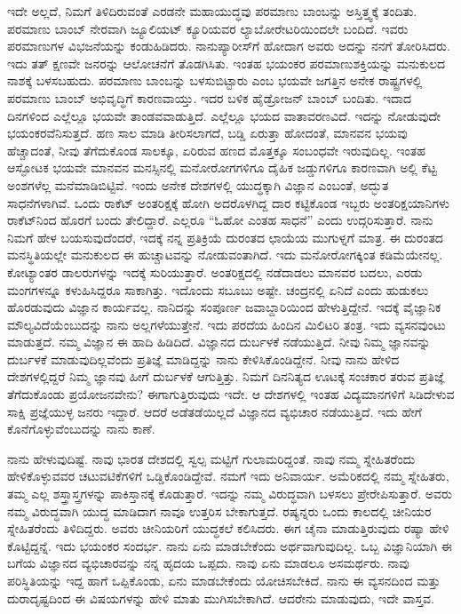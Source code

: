 ಇದೇ ಅಲ್ಲದೆ, ನಿಮಗೆ ತಿಳಿದಿರುವಂತೆ ಎರಡನೇ ಮಹಾಯುದ್ಧವು ಪರಮಾಣು ಬಾಂಬನ್ನು ಅಸ್ತಿತ್ತ್ವಕ್ಕೆ ತಂದಿತು. ಪರಮಾಣು ಬಾಂಬ್ ನೇರವಾಗಿ ಜ್ಯೂಲಿಯಟ್ ಕ್ಯೂರಿಯವರ ಲ್ಯಾಬೋರೇಟರಿ\-ಯಿಂದಲೇ ಬಂದಿದೆ. ಇವರು ಪರಮಾಣುಗಳ ವಿಭಜನೆಯನ್ನು ಕಂಡುಹಿಡಿದರು. ನಾನು\break ಪ್ಯಾರೀಸ್‍ಗೆ ಹೋದಾಗ ಅವರು ಅದನ್ನು ನನಗೆ ತೋರಿಸಿದರು. ಇದು ತತ್ ಕ್ಷಣವೇ ಜನರನ್ನು ಆಲೋಚನೆಗೆ ತೊಡಗಿಸಿತು. ಇಂತಹ ಭಯಂಕರ ಪರಮಾಣುಶಕ್ತಿಯನ್ನು ಮನುಕುಲದ ನಾಶಕ್ಕೆ ಬಳಸಬಹುದು. ಪರಮಾಣು ಬಾಂಬನ್ನು ಬಳಸುಬಿಟ್ಟಾರು ಎಂಬ ಭಯವೇ ಜಗತ್ತಿನ ಅನೇಕ ರಾಷ್ಟ್ರಗಳಲ್ಲಿ ಪರಮಾಣು ಬಾಂಬ್ ಅಭಿವೃದ್ಧಿಗೆ ಕಾರಣವಾಯ್ತು. ಇದರ ಬಳಿಕ ಹೈಡ್ರೋಜನ್ ಬಾಂಬ್ ಬಂದಿತು. ಇದಾದ ದಿನಗಳಿಂದ ಎಲ್ಲೆಲ್ಲೂ ಭಯವೇ ತಾಂಡವವಾಡುತ್ತಿದೆ. ಎಲ್ಲೆಲ್ಲೂ ಭಯದ ವಾತಾವರಣವಿದೆ. ಇದನ್ನು ನೋಡುವುದೇ ಭಯಂಕರವೆನಿಸುತ್ತದೆ. ಹಣ ಸಾಲ ಮಾಡಿ ತೀರಿಸಲಾಗದೆ, ಬಡ್ಡಿ ಏರುತ್ತಾ ಹೋದಂತೆ, ಮಾನವನ ಭಯವು ಹೆಚ್ಚಾದಂತೆ, ನೀವು ತೆಗೆದುಕೊಂಡ ಸಾಲಕ್ಕೂ, ಏರಿರುವ ಹಣದ ಮೊತ್ತಕ್ಕೂ ಸಂಬಂಧವೇ ಇರುವುದಿಲ್ಲ. ಇಂತಹ ಆಸ್ಫೋಟಕ ಭಯವೇ ಮಾನವನ ಮನಸ್ಸಿನಲ್ಲಿ ಮನೋರೋಗಗಳಿಗೂ ದೈಹಿಕ ಜಡ್ಡುಗಳಿಗೂ ಕಾರಣವಾಗಿ ಅಲ್ಲಿ ಕೆಟ್ಟ ಅಂಶಗಳೆಲ್ಲ ಮನೆಮಾಡಿಬಿಟ್ಟಿವೆ. ಇಂದು ಅನೇಕ ದೇಶಗಳಲ್ಲಿ ಯುದ್ಧಕ್ಕಾಗಿ ವಿಜ್ಞಾನ ಎಂಬಂತೆ, ಅದ್ಭುತ ಸಾಧನೆಗಳಾಗಿವೆ. ಒಂದು ರಾಕೆಟ್ ಅಂತರಿಕ್ಷಕ್ಕೆ ಹೋಗಿ ಅದರೊಳಗಿದ್ದ ದಾರ ಕಟ್ಟಿಕೊಂಡ ಇಬ್ಬರು ಅಂತರಿಕ್ಷಯಾನಿಗಳು ರಾಕೆಟ್‍ನಿಂದ ಹೊರಗೆ ಬಂದು ತೇಲಿದ್ದಾರೆ. ಎಲ್ಲರೂ “ಓಹೋ ಎಂತಹ ಸಾಧನೆ” ಎಂದು ಉದ್ಗರಿಸುತ್ತಾರೆ. ನಾನು ನಿಮಗೆ ಹೇಳ ಬಯಸುವುದೆಂದರೆ, ಇದಕ್ಕೆ ನನ್ನ ಪ್ರತಿಕ್ರಿಯೆ ದುರಂತದ ಛಾಯೆಯ ಮುಗುಳ್ನಗೆ ಮಾತ್ರ. ಈ ದುರಂತದ ಮನಸ್ಥಿತಿಯಲ್ಲೇ ಮನುಕುಲದ ಈ ಹುಚ್ಚಾಟವನ್ನು ನೋಡುವಂತಾಗಿದೆ. ಇದು ಮನೋರೋಗಕ್ಕಿಂತ ಕಡಿಮೆಯೇನಲ್ಲ. ಕೋಟ್ಯಾಂತರ ಡಾಲರುಗಳನ್ನು ಇದಕ್ಕೆ ಸುರಿಯುತ್ತಾರೆ. ಅಂತರಿಕ್ಷದಲ್ಲಿ ನಡೆದಾಡಲು ಮಾನವರ ಬದಲು, ಎರಡು ಮಂಗಗಳನ್ನೂ ಕಳುಹಿಸಿದ್ದರೂ ಸಾಕಾಗಿತ್ತು. ಇದೊಂದು ಸಬೂಬು ಅಷ್ಟೇ. ಚಂದ್ರನಲ್ಲಿ ಏನಿದೆ ಎಂದು ಹುಡುಕಲು ಹೊರಡುವುದು ವಿಜ್ಞಾನ ಕಾರ್ಯವಲ್ಲ. ನಾನಿದನ್ನು ಸಂಪೂರ್ಣ ಜವಾಬ್ದಾರಿಯಿಂದ ಹೇಳುತ್ತಿದ್ದೇನೆ. ಇದಕ್ಕೆ ವೈಜ್ಞಾನಿಕ ಮೌಲ್ಯವಿದೆಯೆಂಬುದನ್ನು ನಾನು ಅಲ್ಲಗಳೆಯುತ್ತೇನೆ. ಇದು ಪರದೆಯ ಹಿಂದಿನ ಮಿಲಿಟರಿ ತಂತ್ರ. ಇದು ವ್ಯಸನವುಂಟು ಮಾಡುತ್ತದೆ. ನಮ್ಮ ವಿಜ್ಞಾನ ಈ ಹಾದಿ ಹಿಡಿದಿದೆ. ವಿಜ್ಞಾನದ ದುರ್ಬಳಕೆ ನಡೆಯುತ್ತಿದೆ. ನೀವು ನಿಮ್ಮ ಜ್ಞಾನವನ್ನು ದುರ್ಬಳಕೆ ಮಾಡುವುದಿಲ್ಲವೆಂದು ಪ್ರತಿಜ್ಞೆ ಮಾಡಿದ್ದನ್ನು ನಾನು ಕೇಳಿಸಿಕೊಂಡಿದ್ದೇನೆ. ನೀವು ನಾನು ಹೇಳಿದ ದೇಶಗಳಲ್ಲಿದ್ದರೆ ನಿಮ್ಮ ಜ್ಞಾನವು ಹೀಗೆ ದುರ್ಬಳಕೆ ಆಗುತ್ತಿತ್ತು. ನಿಮಗೆ ದಿನನಿತ್ಯದ ಊಟಕ್ಕೆ ಸಂಚಕಾರ ತರುವ ಪ್ರತಿಜ್ಞೆ ತೆಗೆದುಕೊಂಡು ಪ್ರಯೋಜನವೇನು? ಈಗಾಗುತ್ತಿರುವುದು ಇದೇ. ಆ ದೇಶಗಳಲ್ಲಿ ಇಂತಹ ವಿದ್ಯಮಾನಗಳಿಗೆ ಸಿಡಿದೇಳುವ ಸಾಕ್ಷಿ ಪ್ರಜ್ಞೆಯುಳ್ಳ ಜನರು ಇದ್ದಾರೆ. ಆದರೆ ಅಡೆತಡೆಯಿಲ್ಲದೆ ವಿಜ್ಞಾನದ ವ್ಯಭಿಚಾರ ನಡೆಯುತ್ತಿದೆ. ಇದು ಹೇಗೆ ಕೊನೆಗೊಳ್ಳುವೆಂಬುದನ್ನು ನಾನು ಕಾಣೆ.

ನಾನು ಹೇಳುವುದಿಷ್ಟೆ. ನಾವು ಭಾರತ ದೇಶದಲ್ಲಿ ಸ್ವಲ್ಪ ಮಟ್ಟಿಗೆ ಗುಲಾಮರಿದ್ದಂತೆ. ನಾವು ನಮ್ಮ ಸ್ನೇಹಿತರೆಂದು ಹೇಳಿಕೊಳ್ಳುವವರ ಚಟುವಟಿಕೆಗಳಿಗೆ ಒಡ್ಡಿಕೊಂಡಿದ್ದೇವೆ. ನಮಗೆ ಇದು ಅನಿವಾರ್ಯ. ಅಮೆರಿಕದಲ್ಲಿ ನಮ್ಮ ಸ್ನೇಹಿತರು, ತಮ್ಮ ಎಲ್ಲ ಶಸ್ತ್ರಾಸ್ತ್ರಗಳನ್ನು ಪಾಕಿಸ್ತಾನಕ್ಕೆ ಕೊಡುತ್ತಾರೆ. ಇದನ್ನು ನಮ್ಮ ವಿರುದ್ಧವಾಗಿ ಬಳಸಲು ಪ್ರೇರೇಪಿಸುತ್ತಾರೆ. ಅವರು ನಮ್ಮ ವಿರುದ್ಧವಾಗಿ ಯುದ್ಧ ಮಾಡಿದಾಗ ನಾವೂ ಉತ್ತರಿಸ ಬೇಕಾಗುತ್ತದೆ. ರಷ್ಯನ್ನರು ಒಂದು ಕಾಲದಲ್ಲಿ ಚೀನಿಯರ ಸ್ನೇಹಿತರೆಂದು ತಿಳಿದಿದ್ದರು. ಅವರು ಚೀನಿಯರಿಗೆ ಯುದ್ಧಕಲೆ ಕಲಿಸಿದರು. ಈಗ ಚೈನಾ ಮಾಡುತ್ತಿರುವುದು ರಷ್ಯಾ ಹೇಳಿ ಕೊಟ್ಟಿದ್ದನ್ನೆ. ಇದು ಭಯಂಕರ ಸಂದರ್ಭ. ನಾನು ಏನು ಮಾಡಬೇಕೆಂದು ಅರ್ಥವಾಗುವುದಿಲ್ಲ. ಒಬ್ಬ ವಿಜ್ಞಾನಿಯಾಗಿ ಈ ಬಗೆಯ ವಿಜ್ಞಾನದ ವ್ಯಭಿಚಾರವನ್ನು ನನ್ನ ಹೃದಯ ಒಪ್ಪದು. ನಾವು ಏನು ಮಾಡಲೂ ಅಸಮರ್ಥರು. ನಾವು ಪರಿಸ್ಥಿತಿಯನ್ನು ಇದ್ದ ಹಾಗೆ ಒಪ್ಪಿಕೊಂಡು, ಏನು ಮಾಡಬೇಕೆಂದು ಯೋಚಿಸಬೇಕಿದೆ. ನಾನು ಈ ವ್ಯಸನದಿಂದ ಮತ್ತು ದುರಾದೃಷ್ಟದಿಂದ ಈ ವಿಷಯಗಳನ್ನು ಹೇಳಿ ಮಾತು ಮುಗಿಸಬೇಕಾಗಿದೆ. ಆದರೇನು ಮಾಡುವುದು, ಇದೇ ವಾಸ್ತವ.

